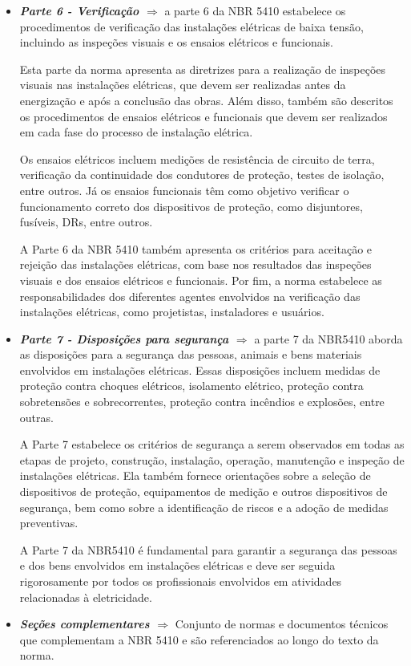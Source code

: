 \documentclass[a4paper, 12pt, onecolumn,singlespacing]{article}
\begin{document}
\begin{itemize}
			\item \textbf{\textit{Parte 6 - Verificação $\Rightarrow$ }}a parte 6 da NBR 5410 estabelece os procedimentos de verificação das instalações elétricas de baixa tensão, incluindo as inspeções visuais e os ensaios elétricos e funcionais.
			
			Esta parte da norma apresenta as diretrizes para a realização de inspeções visuais nas instalações elétricas, que devem ser realizadas antes da energização e após a conclusão das obras. Além disso, também são descritos os procedimentos de ensaios elétricos e funcionais que devem ser realizados em cada fase do processo de instalação elétrica.
			
			Os ensaios elétricos incluem medições de resistência de circuito de terra, verificação da continuidade dos condutores de proteção, testes de isolação, entre outros. Já os ensaios funcionais têm como objetivo verificar o funcionamento correto dos dispositivos de proteção, como disjuntores, fusíveis, DRs, entre outros.
			
			A Parte 6 da NBR 5410 também apresenta os critérios para aceitação e rejeição das instalações elétricas, com base nos resultados das inspeções visuais e dos ensaios elétricos e funcionais. Por fim, a norma estabelece as responsabilidades dos diferentes agentes envolvidos na verificação das instalações elétricas, como projetistas, instaladores e usuários.
			
			\item \textbf{\textit{Parte 7 - Disposições para segurança $\Rightarrow$ }}a parte 7 da NBR5410 aborda as disposições para a segurança das pessoas, animais e bens materiais envolvidos em instalações elétricas. Essas disposições incluem medidas de proteção contra choques elétricos, isolamento elétrico, proteção contra sobretensões e sobrecorrentes, proteção contra incêndios e explosões, entre outras.
			
			A Parte 7 estabelece os critérios de segurança a serem observados em todas as etapas de projeto, construção, instalação, operação, manutenção e inspeção de instalações elétricas. Ela também fornece orientações sobre a seleção de dispositivos de proteção, equipamentos de medição e outros dispositivos de segurança, bem como sobre a identificação de riscos e a adoção de medidas preventivas.
			
			A Parte 7 da NBR5410 é fundamental para garantir a segurança das pessoas e dos bens envolvidos em instalações elétricas e deve ser seguida rigorosamente por todos os profissionais envolvidos em atividades relacionadas à eletricidade.
			
			\item \textbf{\textit{Seções complementares $\Rightarrow$ }} Conjunto de normas e documentos técnicos que complementam a NBR 5410 e são referenciados ao longo do texto da norma. 
		\end{itemize}
		
\end{document}
